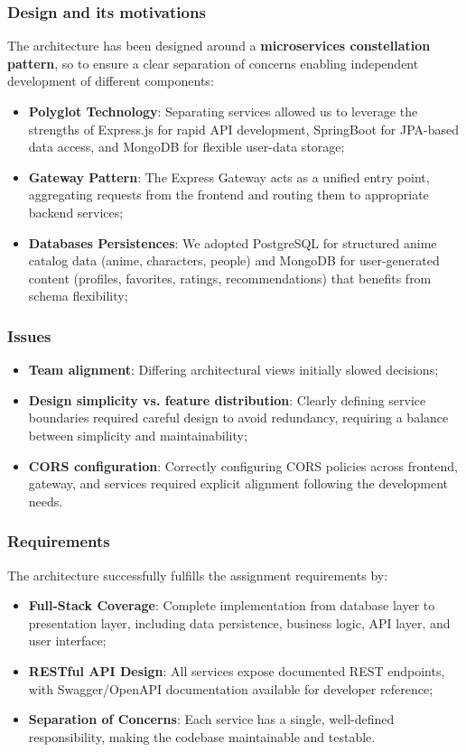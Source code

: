 \documentclass[11pt,a4paper]{article}
\begin{document}
\subsubsection{Design and its motivations}
The architecture has been designed around a \textbf{microservices constellation pattern}, so to ensure a clear separation of concerns enabling independent development of different components:
\begin{itemize}
    \item \textbf{Polyglot Technology}: Separating services allowed us to leverage the strengths of Express.js for rapid API development, SpringBoot for JPA-based data access, and MongoDB for flexible user-data storage;
    \item \textbf{Gateway Pattern}: The Express Gateway acts as a unified entry point, aggregating requests from the frontend and routing them to appropriate backend services;
    \item \textbf{Databases Persistences}: We adopted PostgreSQL for structured anime catalog data (anime, characters, people) and MongoDB for user-generated content (profiles, favorites, ratings, recommendations) that benefits from schema flexibility;
\end{itemize}

\subsubsection{Issues}
\begin{itemize}
    \item \textbf{Team alignment}: Differing architectural views initially slowed decisions;
    \item \textbf{Design simplicity vs. feature distribution}: Clearly defining service boundaries required careful design to avoid redundancy, requiring a balance between simplicity and maintainability;
    \item \textbf{CORS configuration}: Correctly configuring CORS policies across frontend, gateway, and services required explicit alignment following the development needs.
\end{itemize}

\subsubsection{Requirements}
The architecture successfully fulfills the assignment requirements by:
\begin{itemize}
    \item \textbf{Full-Stack Coverage}: Complete implementation from database layer to presentation layer, including data persistence, business logic, API layer, and user interface;
    \item \textbf{RESTful API Design}: All services expose documented REST endpoints, with Swagger/OpenAPI documentation available for developer reference;
    \item \textbf{Separation of Concerns}: Each service has a single, well-defined responsibility, making the codebase maintainable and testable.
\end{itemize}
\end{document}
